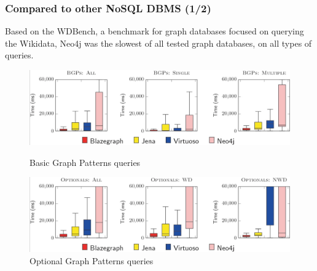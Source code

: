 \documentclass[aspectratio=169]{beamer}
\begin{document}
\begin{frame}
    \frametitle{Compared to other NoSQL DBMS (1/2)}
    Based on the WDBench, a benchmark for graph databases focused on querying the Wikidata,
    Neo4j was the slowest of all tested graph databases, on all types of queries. 

    \begin{figure}
        \begin{minipage}{0.48\textwidth}
            \centering
            \includegraphics[width=\linewidth]{benchWD1.png}
            \caption{Basic Graph Patterns queries}
            \label{fig:bgp}
        \end{minipage}\hfill
        \begin{minipage}{0.48\textwidth}
            \centering
            \includegraphics[width=\linewidth]{benchWD2.png}
            \caption{Optional Graph Patterns queries}
            \label{fig:ogp}
        \end{minipage}
    \end{figure}


\end{frame}
\end{document}
